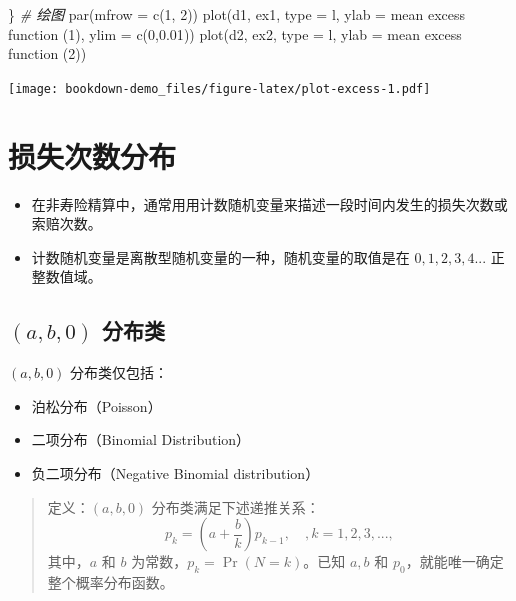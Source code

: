 \documentclass[
]{book}
\newenvironment{Shaded}{\begin{snugshade}}{\end{snugshade}}
\newcommand{\AttributeTok}[1]{\textcolor[rgb]{0.77,0.63,0.00}{#1}}
\newcommand{\CommentTok}[1]{\textcolor[rgb]{0.56,0.35,0.01}{\textit{#1}}}
\newcommand{\DecValTok}[1]{\textcolor[rgb]{0.00,0.00,0.81}{#1}}
\newcommand{\FloatTok}[1]{\textcolor[rgb]{0.00,0.00,0.81}{#1}}
\newcommand{\FunctionTok}[1]{\textcolor[rgb]{0.00,0.00,0.00}{#1}}
\newcommand{\NormalTok}[1]{#1}
\newcommand{\StringTok}[1]{\textcolor[rgb]{0.31,0.60,0.02}{#1}}
\begin{document}
\begin{Shaded}
\begin{Highlighting}[]
\NormalTok{\}}
\CommentTok{\# 绘图}
\FunctionTok{par}\NormalTok{(}\AttributeTok{mfrow =} \FunctionTok{c}\NormalTok{(}\DecValTok{1}\NormalTok{, }\DecValTok{2}\NormalTok{))}
\FunctionTok{plot}\NormalTok{(d1, ex1, }\AttributeTok{type =} \StringTok{\textquotesingle{}l\textquotesingle{}}\NormalTok{, }\AttributeTok{ylab =} \StringTok{\textquotesingle{}mean excess function (1)\textquotesingle{}}\NormalTok{, }\AttributeTok{ylim =} \FunctionTok{c}\NormalTok{(}\DecValTok{0}\NormalTok{,}\FloatTok{0.01}\NormalTok{))}
\FunctionTok{plot}\NormalTok{(d2, ex2, }\AttributeTok{type =} \StringTok{\textquotesingle{}l\textquotesingle{}}\NormalTok{, }\AttributeTok{ylab =} \StringTok{\textquotesingle{}mean excess function (2)\textquotesingle{}}\NormalTok{)}
\end{Highlighting}
\end{Shaded}

\texttt{[image: bookdown-demo\_files/figure-latex/plot-excess-1.pdf]}

\hypertarget{ux635fux5931ux6b21ux6570ux5206ux5e03}{%
\section{损失次数分布}\label{ux635fux5931ux6b21ux6570ux5206ux5e03}}

\begin{itemize}
\item
  在非寿险精算中，通常用用计数随机变量来描述一段时间内发生的损失次数或索赔次数。
\item
  计数随机变量是离散型随机变量的一种，随机变量的取值是在 \(0,1,2, 3,4...\) 正整数值域。
\end{itemize}

\hypertarget{ab0-ux5206ux5e03ux7c7b}{%
\subsection{\texorpdfstring{\((a,b,0)\) 分布类}{(a,b,0) 分布类}}\label{ab0-ux5206ux5e03ux7c7b}}

\((a,b,0)\) 分布类仅包括：

\begin{itemize}
\item
  泊松分布（Poisson）
\item
  二项分布（Binomial Distribution）
\item
  负二项分布（Negative Binomial distribution）
\end{itemize}

\begin{quote}
定义：\((a,b,0)\) 分布类满足下述递推关系：
\[p_k=(a+\frac{b}{k})p_{k-1}, \quad, k=1,2,3,...,\]
其中，\(a\) 和 \(b\) 为常数，\(p_k = \Pr(N=k)\)。已知 \(a,b\) 和 \(p_0\)，就能唯一确定整个概率分布函数。
\end{quote}
\end{document}

